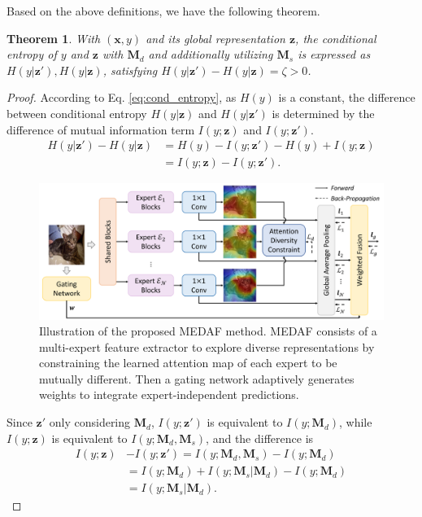 \documentclass[letterpaper]{article} %
\newtheorem{theorem}{Theorem}
\begin{document}
Based on the above definitions, we have the following theorem.
\begin{theorem}
    With $(\boldsymbol{x},y)$ and its global representation $\boldsymbol{z}$, the conditional entropy of $y$ and $\boldsymbol{z}$ with $\boldsymbol{M}_d$ and additionally utilizing $\boldsymbol{M}_s$ is expressed as $H(y|\boldsymbol{z}'),H(y|\boldsymbol{z})$, satisfying $H(y|\boldsymbol{z}')-H(y|\boldsymbol{z})=\zeta>0$.
\label{thm:1}
\end{theorem}

\begin{proof}
According to Eq. \eqref{eq:cond_entropy}, as $H(y)$ is a constant, the difference between conditional entropy $H(y|\boldsymbol{z})$ and $H(y|\boldsymbol{z}')$ is determined by the difference of mutual information term $I(y;\boldsymbol{z})$ and $I(y;\boldsymbol{z}')$.
\begin{equation}
\begin{aligned}
H(y|\boldsymbol{z}')-H(y|\boldsymbol{z})&=H(y)-I(y;\boldsymbol{z}')-H(y)+I(y;\boldsymbol{z})
\\&=I(y;\boldsymbol{z})-I(y;\boldsymbol{z}').
\label{eq:cond_entropy}
\end{aligned}
\end{equation}

\begin{figure}[t]
  \begin{center}
  \includegraphics[width=0.8\linewidth]{Figs/Fig_arch.pdf}
    \caption{Illustration of the proposed MEDAF method. MEDAF consists of a multi-expert feature extractor to explore diverse representations by constraining the learned attention map of each expert to be mutually different. Then a gating network adaptively generates weights to integrate expert-independent predictions.}
    \label{fig:Fig_arch}
    \end{center}
\end{figure}

Since $\boldsymbol{z}'$ only considering $\boldsymbol{M}_d$, $I(y;\boldsymbol{z}')$ is equivalent to $I(y;\boldsymbol{M}_d)$, while $I(y;\boldsymbol{z})$ is equivalent to $I(y;\boldsymbol{M}_d,\boldsymbol{M}_s)$, and the difference is
\begin{equation}
\begin{aligned}
I(y;\boldsymbol{z})&-I(y;\boldsymbol{z}')=I(y;\boldsymbol{M}_d,\boldsymbol{M}_s)-I(y;\boldsymbol{M}_d)\\&=I(y;\boldsymbol{M}_d)+I(y;\boldsymbol{M}_s|\boldsymbol{M}_d)-I(y;\boldsymbol{M}_d)
\\&=I(y;\boldsymbol{M}_s|\boldsymbol{M}_d).
\label{eq:mutual_info}
\end{aligned}
\end{equation}


\end{proof}
\end{document}
